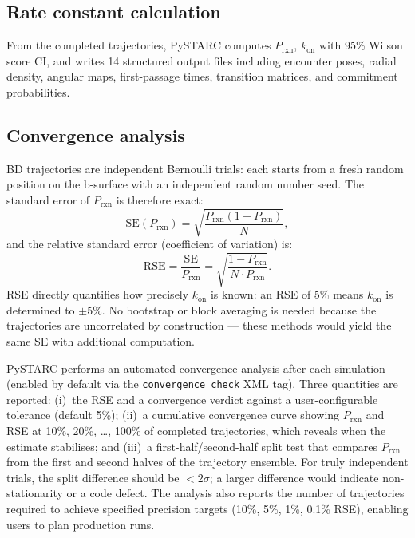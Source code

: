 \documentclass[journal=jctcce,manuscript=article,layout=twocolumn]{achemso}
\newcommand{\kon}{k_{\mathrm{on}}}
\newcommand{\Prxn}{P_{\mathrm{rxn}}}
\begin{document}
\subsection{Rate constant calculation}

From the completed trajectories, PySTARC computes $\Prxn$, $\kon$
with 95\% Wilson score CI, and writes 14 structured output files
including encounter poses, radial density, angular maps,
first-passage times, transition matrices, and commitment
probabilities.

\subsection{Convergence analysis}

BD trajectories are independent Bernoulli trials: each starts
from a fresh random position on the b-surface with an independent
random number seed.
The standard error of $\Prxn$ is therefore exact:
\begin{equation}
\mathrm{SE}(\Prxn) = \sqrt{\frac{\Prxn(1 - \Prxn)}{N}},
\label{eq:se}
\end{equation}
and the relative standard error (coefficient of variation) is:
\begin{equation}
\mathrm{RSE} = \frac{\mathrm{SE}}{\Prxn}
= \sqrt{\frac{1 - \Prxn}{N \cdot \Prxn}}.
\label{eq:rse}
\end{equation}
RSE directly quantifies how precisely $\kon$ is known:
an RSE of 5\% means $\kon$ is determined to $\pm$5\%.
No bootstrap or block averaging is needed because the
trajectories are uncorrelated by construction --- these
methods would yield the same SE with additional computation.

PySTARC performs an automated convergence analysis after
each simulation (enabled by default via the
\texttt{convergence\_check} XML tag).
Three quantities are reported:
(i)~the RSE and a convergence verdict against a user-configurable
tolerance (default 5\%);
(ii)~a cumulative convergence curve showing $\Prxn$ and RSE
at 10\%, 20\%, \ldots, 100\% of completed trajectories, which
reveals when the estimate stabilises;
and (iii)~a first-half/second-half split test that compares
$\Prxn$ from the first and second halves of the trajectory
ensemble.
For truly independent trials, the split difference should be
$< 2\sigma$; a larger difference would indicate non-stationarity
or a code defect.
The analysis also reports the number of trajectories required
to achieve specified precision targets (10\%, 5\%, 1\%, 0.1\%
RSE), enabling users to plan production runs.
\end{document}

